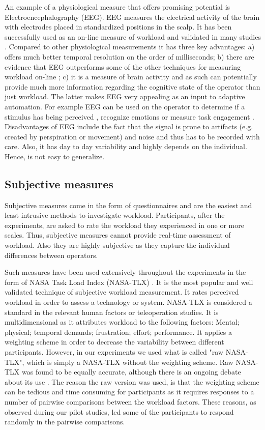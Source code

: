 \documentclass[a4paper,12pt,oneside,openright]{bhamthesis}
\begin{document}
An example of a physiological measure that offers promising potential is Electroencephalography (EEG). EEG measures the electrical activity of the brain with electrodes placed in standardized positions in the scalp. It has been successfully used as an on-line measure of workload and validated in many studies \citep{Wilson2007,Wilson2003,Wilson2000,Kothe2011,Prinzel2003}. Compared to other physiological measurements it has three key advantages: a) offers much better temporal resolution on the order of milliseconds; b) there are evidence that EEG outperforms some of the other techniques for measuring workload on-line \citep{Wilson2003a}; c) it is a measure of brain activity and as such can potentially provide much more information regarding the cognitive state of the operator than just workload. The latter makes EEG very appealing as an input to adaptive automation. For example EEG can be used on the operator to determine if a stimulus has being perceived \citep{Wyble2006a}, recognize emotions \citep{Schaaff2009} or measure task engagement \citep{Berka2007a}. Disadvantages of EEG include the fact that the signal is prone to artifacts (e.g. created by perspiration or movement) and noise and thus has to be recorded with care. Also, it has day to day variability \citep{Christensen2012} and highly depends on the individual. Hence, is not easy to generalize.

\subsection{Subjective measures}
Subjective measures come in the form of questionnaires and are the easiest and least intrusive methods to investigate workload. Participants, after the experiments, are asked to rate the workload they experienced in one or more scales. Thus, subjective measures cannot provide real-time assessment of workload. Also they are highly subjective as they capture the individual differences between operators. 

Such measures have been used extensively throughout the experiments in the form of NASA Task Load Index (NASA-TLX) \citep{Hart1988}. It is the most popular and well validated technique \citep{Hart2006} of subjective workload measurement. It rates perceived workload in order to assess a technology or system. NASA-TLX is considered a standard in the relevant human factors or teleoperation studies. It is multidimensional as it attributes workload to the following factors: Mental; physical; temporal demands; frustration; effort; performance. It applies a weighting scheme in order to decrease the variability between different participants. However, in our experiments we used what is called "raw NASA-TLX", which is simply a NASA-TLX without the weighting scheme. Raw NASA-TLX was found to be equally accurate, although there is an ongoing debate about its use \citep{Hart2006}. The reason the raw version was used, is that the weighting scheme can be tedious and time consuming for participants as it requires responses to a number of pairwise comparisons between the workload factors. These reasons, as observed during our pilot studies, led some of the participants to respond randomly in the pairwise comparisons.
\end{document}
